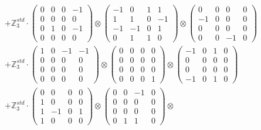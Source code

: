 \documentclass{article}
\begin{document}
{\begin{align}
        &+ \label{Rs13-Rc12-Solution-1-c15} \mathbb{Z}_3^{std} \cdot 
            \begin{pmatrix} 0 & 0 & 0 & -1 \\ 0 & 0 & 0 & 0 \\ 0 & 1 & 0 & -1 \\ 0 & 0 & 0 & 0 \end{pmatrix} \otimes 
            \begin{pmatrix} -1 & 0 & 1 & 1 \\ 1 & 1 & 0 & -1 \\ -1 & -1 & 0 & 1 \\ 0 & 1 & 1 & 0 \end{pmatrix} \otimes 
            \begin{pmatrix} 0 & 0 & 0 & 0 \\ -1 & 0 & 0 & 0 \\ 0 & 0 & 0 & 0 \\ 0 & 0 & -1 & 0 \end{pmatrix} \\ 
        &+ \label{Rs13-Rc12-Solution-1-c16} \mathbb{Z}_3^{std} \cdot 
            \begin{pmatrix} 1 & 0 & -1 & -1 \\ 0 & 0 & 0 & 0 \\ 0 & 0 & 0 & 0 \\ 0 & 0 & 0 & 0 \end{pmatrix} \otimes 
            \begin{pmatrix} 0 & 0 & 0 & 0 \\ 0 & 0 & 0 & 0 \\ 0 & 0 & 0 & 0 \\ 0 & 0 & 0 & 1 \end{pmatrix} \otimes 
            \begin{pmatrix} -1 & 0 & 1 & 0 \\ 0 & 0 & 0 & 0 \\ 0 & 0 & 0 & 0 \\ -1 & 0 & 1 & 0 \end{pmatrix} \\ 
        &+ \label{Rs13-Rc12-Solution-1-c17} \mathbb{Z}_3^{std} \cdot 
            \begin{pmatrix} 0 & 0 & 0 & 0 \\ 1 & 0 & 0 & 0 \\ 1 & -1 & 0 & 1 \\ 1 & 0 & 0 & 0 \end{pmatrix} \otimes 
            \begin{pmatrix} 0 & 0 & -1 & 0 \\ 0 & 0 & 0 & 0 \\ 0 & 0 & 0 & 0 \\ 0 & 1 & 1 & 0 \end{pmatrix} \otimes 

\end{align}}
\end{document}
